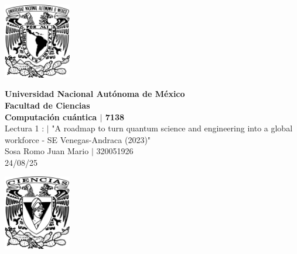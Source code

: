 \begin{center}
    \begin{minipage}{3cm}
    	\begin{center}
    		\includegraphics[height=3.3cm]{src/Img/Logo_UNAM.png}
    	\end{center}
    \end{minipage}\hfill
    \begin{minipage}{10cm}
    	\begin{center}
    	\textbf{\large Universidad Nacional Autónoma de México}\\[0.1cm]
        \textbf{Facultad de Ciencias}\\[0.1cm]
        \textbf{Computación cuántica $|$ 7138}\\[0.1cm]
        Lectura 1 : $|$ "A roadmap to turn quantum science and engineering into a global workforce - SE Venegas-Andraca (2023)" \\[0.1cm]
        Sosa Romo Juan Mario $|$ 320051926 \\[0.1cm]
        24/08/25
    	\end{center}
    \end{minipage}\hfill
    \begin{minipage}{3cm}
    	\begin{center}
    		\includegraphics[height=3.3cm]{src/Img/Logo_FC.png}
    	\end{center}
    \end{minipage}
\end{center}

